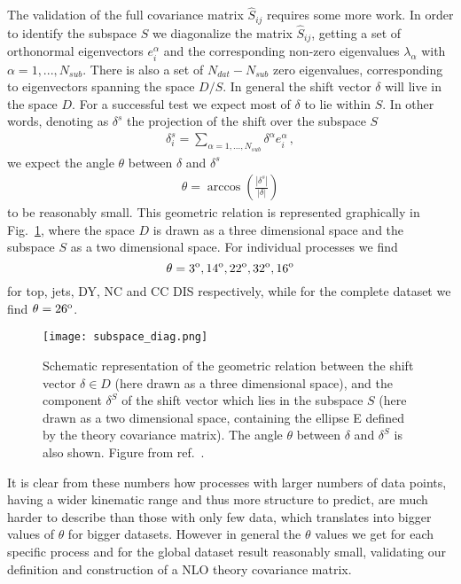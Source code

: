     The validation of the full covariance matrix $\hat{S}_{ij}$ requires some more work.
    In order to identify the subspace $S$ we diagonalize the matrix $\hat{S}_{ij}$, getting a set
    of orthonormal eigenvectors $e_i^{\alpha}$ and the corresponding non-zero eigenvalues 
    $\lambda_{\alpha}$ with $\alpha = 1, ..., N_{sub}$.
    There is also a set of $N_{dat}-N_{sub}$ zero eigenvalues, corresponding to eigenvectors spanning
    the space $D/S$.
    In general the shift vector $\delta$ will live in the space $D$. 
    For a successful test we expect most of $\delta$ to lie within $S$.
    In other words, denoting as $\delta^s$ the projection of the shift over the subspace $S$
    \begin{align}
        \delta_i^s = \sum_{\alpha=1,...,N_{sub}} \delta^{\alpha}e^{\alpha}_i\,,
    \end{align} 
    we expect the angle $\theta$ between $\delta$ and $\delta^s$
    \begin{align}
        \label{eq:angle}
        \theta = \arccos\left(\frac{|\delta^s|}{|\delta|}\right)
    \end{align}
    to be reasonably small. This geometric relation is represented graphically in Fig.~\ref{fig:subspace_diagram},
    where the space $D$ is drawn as a three dimensional space and the subspace $S$ as a two dimensional space.
    For individual processes we find 
    \[\theta = 3^{\rm o}, 14^{\rm o}, 22^{\rm o}, 32^{\rm o}, 16^{\rm o}\]
    for top, jets, DY, NC and CC DIS respectively, 
    while for the complete dataset we find $\theta = 26^{\rm o}$.
    \begin{figure}[t]
        \begin{center}
          \texttt{[image: subspace\_diag.png]}
          \caption{\small Schematic representation of the geometric relation
            between the shift vector $\delta\in D$ (here drawn as a three dimensional space), and
            the component $\delta^S$ of the shift vector which lies in the 
      subspace $S$ (here drawn as a two dimensional space, containing the ellipse E defined by the theory covariance matrix). 
      The angle $\theta$ between $\delta$ and $\delta^S$ is also shown. Figure from ref.~\cite{AbdulKhalek:2019ihb}.
          \label{fig:subspace_diagram} }
        \end{center}
      \end{figure}
    It is clear from these numbers how processes with larger numbers of data points, having 
    a wider kinematic range and thus more structure to predict, are much harder to describe than those 
    with only few data, which translates into bigger values of $\theta$ for bigger datasets. However in general the
    $\theta$ values we get for each specific process and for the global dataset result reasonably small, validating our definition
    and construction of a NLO theory covariance matrix.


